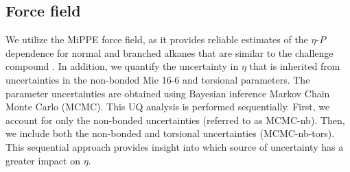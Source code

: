 \documentclass[preprint,review,12pt]{elsarticle}
\begin{document}
		\subsection{Force field} \label{Force Field}
	
	We utilize the MiPPE force field, as it provides reliable estimates of the $\eta$-$P$ dependence for normal and branched alkanes that are similar to the challenge compound \cite{Postdoc_3}. In addition, we quantify the uncertainty in $\eta$ that is inherited from uncertainties in the non-bonded Mie 16-6 and torsional parameters. The parameter uncertainties are obtained using Bayesian inference Markov Chain Monte Carlo (MCMC). This UQ analysis is performed sequentially. First, we account for only the non-bonded uncertainties (referred to as MCMC-nb). Then, we include both the non-bonded and torsional uncertainties (MCMC-nb-tors). This sequential approach provides insight into which source of uncertainty has a greater impact on $\eta$.
	
	
	
	
\end{document}
